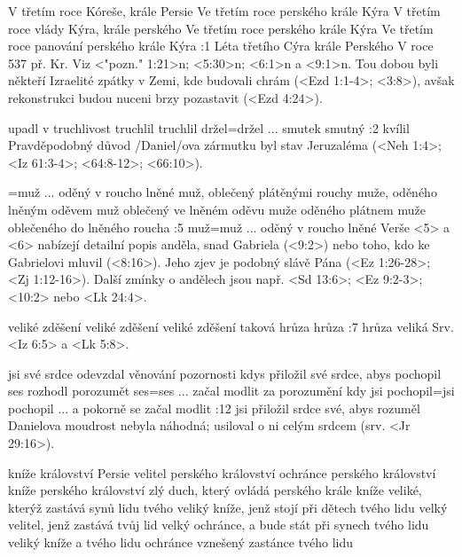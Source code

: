     {V třetím roce Kóreše, krále Persie}   %
    {Ve třetím roce perského krále Kýra}   %
    {V třetím roce vlády Kýra, krále perského}   %
    {Ve třetím roce perského krále Kýra}   %
    {Ve třetím roce panování perského krále Kýra}   %
:1 {Léta třetího Cýra krále Perského} V roce 537 př. Kr. Viz <"pozn." 1:21>n; <5:30>n; <6:1>n a <9:1>n. Tou dobou byli někteří Izraelité  zpátky v Zemi, kde budovali chrám (<Ezd 1:1-4>; <3:8>), avšak rekonstrukci budou nuceni brzy pozastavit (<Ezd 4:24>).

 {upadl v truchlivost} {truchlil} {truchlil} {držel}={držel ... smutek} {smutný}
:2 {kvílil} Pravděpodobný důvod \x/Daniel/ova zármutku byl stav Jeruzaléma (<Neh 1:4>; <Iz 61:3-4>; <64:8-12>; <66:10>).

={muž ... oděný v roucho lněné} 
           {muž, oblečený plátěnými rouchy} 
           {muže, oděného lněným oděvem} 
           {muž oblečený ve lněném oděvu} 
           {muže oděného plátnem} 
           {muže oblečeného do lněného roucha}
:5 {muž}={muž ... oděný v roucho lněné} 
    Verše <5> a <6> nabízejí detailní popis anděla, snad Gabriela (<9:2>) nebo toho, kdo ke Gabrielovi mluvil (<8:16>). Jeho zjev je podobný slávě Pána (<Ez 1:26-28>; <Zj 1:12-16>). Další zmínky o andělech jsou např.  <Sd 13:6>; <Ez 9:2-3>; <10:2> nebo <Lk 24:4>.
    
    {veliké zděšení} %
    {veliké zděšení} %
    {veliké zděšení} %
    {taková hrůza}   %
    {hrůza}          %
:7 {hrůza veliká} Srv. <Iz 6:5> a <Lk 5:8>.

    {jsi své srdce odevzdal věnování pozornosti}   %
    {kdys přiložil své srdce, abys pochopil}   %
    {ses rozhodl porozumět}   %
    {ses}={ses ... začal modlit za porozumění}   %
    {kdy jsi pochopil}={jsi pochopil ... a pokorně se začal modlit}   %
:12 {jsi přiložil srdce své, abys rozuměl} Danielova moudrost nebyla náhodná; usiloval o ni celým srdcem (srv. <Jr 29:16>). 

    {kníže království Persie}   %
    {velitel perského království}   %
    {ochránce perského království}   %
    {kníže perského království}   %
    {zlý duch, který ovládá perského krále}   %
\vdef   
    {kníže veliké, kterýž zastává synů lidu tvého}   %
    {veliký kníže, jenž stojí při dětech tvého lidu}   %
    {velký velitel, jenž zastává tvůj lid}   %
    {velký ochránce, a bude stát při synech tvého lidu}   %
    {veliký kníže a tvého lidu ochránce}   %
    {vznešený zastánce tvého lidu}   %
    
